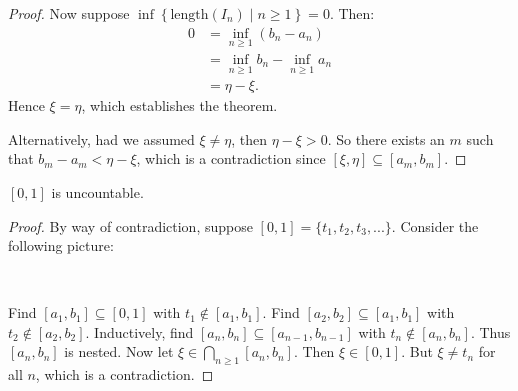 \begin{proof}
            Now suppose $\inf\left\{\text{length}(I_n)\mid n \geq 1\right\} = 0$. Then:
                \begin{equation*}
                \begin{split}
                    0
                    & = \inf_{n \geq 1}(b_n - a_n) \\
                    & = \inf_{n \geq 1}b_n - \inf_{n \geq 1}a_n \\
                    & = \eta - \xi.
                \end{split}
                \end{equation*}
            Hence $\xi = \eta$, which establishes the theorem.

            Alternatively, had we assumed $\xi \neq \eta$, then $\eta - \xi > 0$. So there exists an $m$ such that $b_m - a_m < \eta - \xi$, which is a contradiction since $[\xi , \eta] \subseteq [a_m,b_m]$.
        \end{proof}

    \begin{corollary}
        $[0,1]$ is uncountable.
    \end{corollary}
        \begin{proof}
            By way of contradiction, suppose $[0,1] = \{t_1,t_2,t_3,...\}$. Consider the following picture:
            \begin{center}
                \phantom{a}\\
            \end{center}
            Find $[a_1,b_1] \subseteq [0,1]$ with $t_1 \not\in [a_1,b_1]$. Find $[a_2,b_2] \subseteq [a_1,b_1]$ with $t_2 \not\in [a_2,b_2]$. Inductively, find $[a_n,b_n] \subseteq [a_{n-1},b_{n-1}]$ with $t_n \not\in [a_n,b_n]$. Thus $[a_n,b_n]$ is nested. Now let $\xi \in \bigcap_{n \geq 1}[a_n,b_n]$. Then $\xi \in [0,1]$. But $\xi \neq t_n$ for all $n$, which is a contradiction.
        \end{proof}

